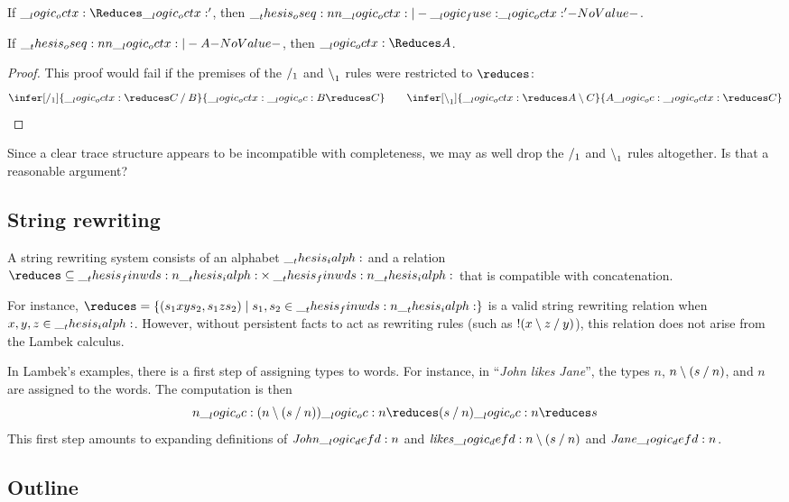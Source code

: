 \begin{theorem}[Soundness]
  If $\octx \Reduces \octx'$, then $\oseq{\octx |- \mathord{\fuse} \octx'}$.
\end{theorem}

\begin{theorem}[Completeness]
  If $\oseq{\octx |- A}$, then $\octx \Reduces A$.
\end{theorem}
%
\begin{proof}
  This proof would fail if the premises of the $\mathbin { / }_1$ and $\mathbin { \setminus }_1$ rules were restricted to $\reduces$:
  \begin{equation*}
    \infer[\pmir_1]{\octx \reduces C \pmir B}{
      \octx \oc B \reduces C}
    \qquad
    \infer[\limp_1]{\octx \reduces A \limp C}{
      A \oc \octx \reduces C}
    \qedhere
  \end{equation*}
\end{proof}

Since a clear trace structure appears to be incompatible with completeness, we may as well drop the $\mathbin { / }_1$ and $\mathbin { \setminus }_1$ rules altogether.
Is that a reasonable argument?


\subsection{String rewriting}

A string rewriting system consists of an alphabet $\__thesis_ialph:$ and a relation $\mathord{\reduces} \subseteq \finwds{\ialph} \times \finwds{\ialph}$ that is compatible with concatenation.

For instance, $\mathord{\reduces} = \{(s_1 xy s_2, s_1 z s_2) \mid s_1,s_2 \in \finwds{\ialph}\}$ is a valid string rewriting relation when $x,y,z \in \__thesis_ialph:$.
However, without persistent facts to act as rewriting rules (such as $!(x \mathbin { \setminus } z \mathbin { / } y)$), this relation does not arise from the Lambek calculus.


In Lambek's examples, there is a first step of assigning types to words.
For instance, in \enquote{\itshape John likes Jane}, the types $n$, $n \mathbin { \setminus } (s \mathbin { / } n)$, and $n$ are assigned to the words.
The computation is then 
\begin{equation*}
  n \oc (n \limp (s \pmir n)) \oc n \reduces (s \pmir n) \oc n \reduces s
\end{equation*}
This first step amounts to expanding definitions of $\mathit{John} \__logic_defd: n$ and $\mathit{likes} \__logic_defd: n \mathbin { \setminus } (s \mathbin { / } n)$ and $\mathit{Jane} \__logic_defd: n$.

\subsection{Outline}

